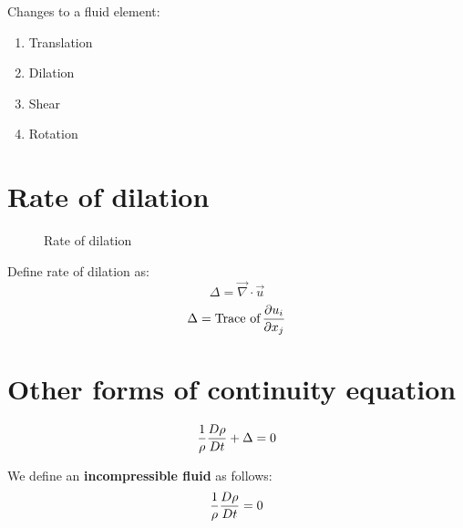Changes to a fluid element:
\begin{enumerate}
\item Translation
\item Dilation
\item Shear
\item Rotation
\end{enumerate}


\section{Rate of dilation}

\begin{figure}[h]
\begin{center}
\end{center}
\caption{Rate of dilation}
\label{CVTranslation5}
\end{figure}

Define rate of dilation as:
$$ \Delta = \vec{\nabla} \cdot \vec{u} $$
$$ \Delta = \text{Trace of} \, {\partial u_i \over \partial x_j} $$


\section{Other forms of continuity equation}

$$ {1 \over \rho} {D \rho \over D t} + \Delta = 0 $$

We define an {\bf incompressible fluid} as follows:
$$ {1 \over \rho} {D \rho \over D t} = 0 $$

